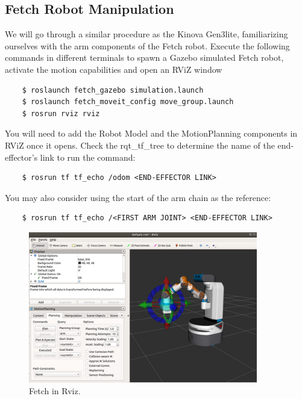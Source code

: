 \documentclass[12pt]{article}
\begin{document}
\subsection{Fetch Robot Manipulation}
We will go through a similar procedure as the Kinova Gen3lite, familiarizing ourselves with the arm components of the Fetch robot. Execute the following commands in different terminals to spawn a Gazebo simulated Fetch robot, activate the motion capabilities and open an RViZ window

\begin{verbatim}
    $ roslaunch fetch_gazebo simulation.launch
    $ roslaunch fetch_moveit_config move_group.launch
    $ rosrun rviz rviz
    \end{verbatim}

You will need to add the Robot Model and the MotionPlanning components in RViZ once it opens. Check the rqt\_tf\_tree to determine the name of the end-effector’s link to run the command:

\begin{verbatim}
    $ rosrun tf tf_echo /odom <END-EFFECTOR LINK>
    \end{verbatim}
    
You may also consider using the start of the arm chain as the reference:

\begin{verbatim}
    $ rosrun tf tf_echo /<FIRST ARM JOINT> <END-EFFECTOR LINK>
    \end{verbatim}

\begin{figure}[H]
    \vspace{-10pt}
    \centering\includegraphics[width=10cm]{images/rviz2.png}\vspace{-10pt}
    \caption{Fetch in Rviz.}\label{fig:rviz2}
    \end{figure}
\end{document}
